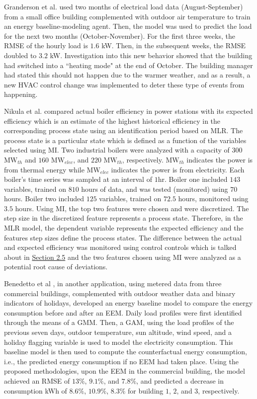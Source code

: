 Granderson et al. \cite{lawrence-lab} used two months of electrical load data (August-September) from a small office building complemented with outdoor air temperature to train an energy baseline-modeling agent. Then, the model was used to predict the load for the next two months (October-November). For the first three weeks, the \ac{RMSE} of the hourly load is $1.6$ \ac{kW}. Then, in the subsequent weeks, the RMSE doubled to $3.2$ kW. Investigation into this new behavior showed that the building had switched into a ``heating mode" at the end of October. The building manager had stated this should not happen due to the warmer weather, and as a result, a new \ac{HVAC} control change was implemented to deter these type of events from happening. 

Nikula et al.\cite{boiler} compared actual boiler efficiency in power stations with its expected efficiency which is an estimate of the highest historical efficiency in the corresponding process state using an identification period based on MLR. The process state is a particular state which is defined as a function of the variables selected using \ac{MI}. Two industrial boilers were analyzed with a capacity of $300$ $\text{MW}_{th}$ and $160$ $\text{MW}_{elec}$, and $220$ $\text{MW}_{th}$, respectively. $\text{MW}_{th}$ indicates the power is from thermal energy while $\text{MW}_{elec}$ indicates the power is from electricity. Each boiler's time series was sampled at an interval of $1$hr. Boiler one included $143$ variables, trained on $810$ hours of data, and was tested (monitored) using $70$ hours. Boiler two included $125$ variables, trained on $72.5$ hours, monitored using $3.5$ hours. Using MI, the top two features were chosen and were discretized. The step size in the discretized feature represents a process state. Therefore, in the MLR model, the dependent variable represents the expected efficiency and the features step sizes define the process states. The difference between the actual and expected efficiency was monitored using control controls which is talked about in \hyperlink{subsection.2.5}{Section 2.5} and the two features chosen using MI were analyzed as a potential root cause of deviations.

Benedetto et al \cite{data-driven-MV}, in another application, using metered data from three commercial buildings, complemented with outdoor weather data and binary indicators of holidays, developed an energy baseline model to compare the energy consumption before and after an \ac{EEM}. Daily load profiles were first identified through the means of a \ac{GMM}. Then, a \ac{GAM}, using the load profiles of the previous seven days, outdoor temperature, sun altitude, wind speed, and a holiday flagging variable is used to model the electricity consumption. This baseline model is then used to compute the counterfactual energy consumption, i.e., the predicted energy consumption if no EEM had taken place. Using the proposed methodologies, upon the EEM in the commercial building, the model achieved an RMSE of $13\%$, $9.1\%$, and $7.8\%$, and predicted a decrease in consumption \ac{kWh} of $8.6\%$, $10.9\%$, $8.3\%$ for building $1$, $2$, and $3$, respectively.

